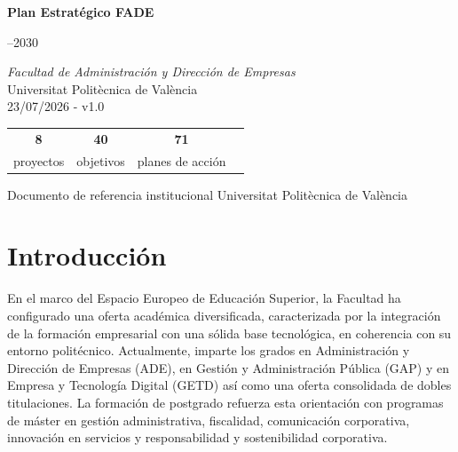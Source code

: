\documentclass[11pt,a4paper]{scrreprt}
\begin{document}
\begin{titlepage}
\pagecolor{navycolor}
\color{white}
\centering
\vspace*{2cm}


\vspace{2cm}
{\fontsize{30}{38}\selectfont\bfseries Plan Estrat\'egico FADE}

\vspace{0.6cm}
{\fontsize{24}{30}--2030}

\vspace{1.2cm}
{\large\itshape Facultad de Administración y Dirección de Empresas}\\[0.3cm]
{\large Universitat Polit\`ecnica de Val\`encia}\\[0.3cm]
\vspace{1.2cm}
{\large 23/07/2026 - v1.0}

\vspace{3cm}
\begin{tabular}{cccc}
{\Huge\bfseries 8}  & {\Huge\bfseries 40} & {\Huge\bfseries 71}  \\[4pt]
{\small proyectos}  & {\small objetivos}  & {\small planes de acci\'on} \\
\end{tabular}

\vfill
{\small\color{white!60!navycolor}Documento de referencia institucional \quad\textbullet\quad Universitat Polit\`ecnica de Val\`encia}
\end{titlepage}
\nopagecolor

\tableofcontents
\clearpage

\chapter*{Introducci\'on}
En el marco del Espacio Europeo de Educación Superior, la Facultad ha configurado una oferta académica diversificada, caracterizada por la integración de la formación empresarial con una sólida base tecnológica, en coherencia con su entorno politécnico. Actualmente, imparte los grados en Administración y Dirección de Empresas (ADE), en Gestión y Administración Pública (GAP) y en Empresa y Tecnología Digital (GETD) así como una oferta consolidada de dobles titulaciones. La formación de postgrado refuerza esta orientación con programas de máster en gestión administrativa, fiscalidad, comunicación corporativa, innovación en servicios y responsabilidad y sostenibilidad corporativa.
\end{document}
